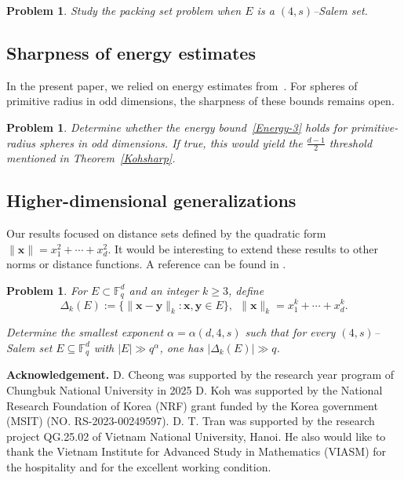\documentclass[11pt]{article}
\newtheorem{problem}[theorem]{Problem}
\def\F{\mathbb{F}}
\begin{document}
\begin{problem}
Study the packing set problem when $E$ is a $(4, s)$--Salem set.
\end{problem}

\subsection{Sharpness of energy estimates}

In the present paper, we relied on energy estimates from~\cite{IKL2020, IKLPS2021,KPV2021}. For spheres of primitive radius in odd dimensions, the sharpness of these bounds remains open.

\begin{problem}
Determine whether the energy bound~\eqref{Energy-3} holds for primitive-radius spheres in odd dimensions. If true, this would yield the $\frac{d-1}{2}$ threshold mentioned in Theorem~\ref{Kohsharp}.
\end{problem}

\subsection{Higher-dimensional generalizations}

Our results focused on distance sets defined by the quadratic form $\|\mathbf{x}\|= x_1^2 + \cdots + x_d^2$. It would be interesting to extend these results to other norms or distance functions. A reference can be found in \cite{AK, ks}.

\begin{problem} For $E\subset \mathbb{F}_q^d$ and an integer $k\ge 3$, define 
\[
\Delta_k(E) := \{\|\mathbf{x} - \mathbf{y}\|_k : \mathbf{x}, \mathbf{y} \in E\}, ~~\|\mathbf{x}\|_k=x_1^k+\cdots+x_d^k.
\]

Determine the smallest exponent \(\alpha=\alpha(d,4,s)\) such that for every \((4,s)\)–Salem set \(E\subseteq\F_q^d\) with \(|E|\gg q^{\alpha}\),  one has \(|\Delta_k(E)|\gg q\).
\end{problem}











{\bf Acknowledgement.} D. Cheong was supported by the research year program
of Chungbuk National University in 2025
D. Koh was supported by the National Research Foundation of Korea (NRF) grant funded by the Korea
government (MSIT) (NO. RS-2023-00249597). D. T. Tran was supported by the research project QG.25.02 of Vietnam National University, Hanoi. 
He also would like to thank the Vietnam Institute for Advanced Study in Mathematics (VIASM) for the hospitality and for the excellent working condition. 
\end{document}

